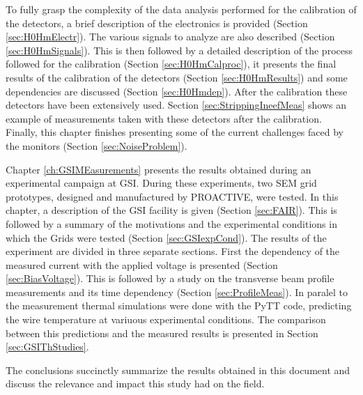 To fully grasp the complexity of the data analysis performed for the calibration of the detectors, a brief description of the electronics is provided (Section \ref{sec:H0HmElectr}). The various signals to analyze are also described (Section \ref{sec:H0HmSignals}). This is then followed by a detailed description of the process followed for the calibration (Section \ref{sec:H0HmCalproc}), it presents the final results of the calibration of the detectors (Section \ref{sec:H0HmResults}) and some dependencies are discussed (Section \ref{sec:H0Hmdep}). After the calibration these detectors have been extensively used. Section \ref{sec:StrippingIneefMeas} shows an example of measurements taken with these detectors after the calibration. Finally, this chapter finishes presenting some of the current challenges faced by the \hzhm monitors (Section \ref{sec:NoiseProblem}). 

Chapter \ref{ch:GSIMEasurements} presents the results obtained during an experimental campaign at GSI. During these experiments, two SEM grid prototypes, designed and manufactured by PROACTIVE, were tested. In this chapter, a description of the GSI facility is given (Section \ref{sec:FAIR}). This is followed by a summary of the motivations and the experimental conditions in which the Grids were tested  (Section \ref{sec:GSIexpCond}). The results of the experiment are divided in three separate sections. First the dependency of the measured current with the applied voltage is presented (Section \ref{sec:BiasVoltage}). This is followed by a study on the transverse beam profile measurements and its time dependency (Section \ref{sec:ProfileMeas}). In paralel to the measurement thermal simulations were done with the PyTT code, predicting the wire temperature at variuous experimental conditions. The comparison between this predictions and the measured results is presented in Section \ref{sec:GSIThStudies}.

The conclusions succinctly summarize the results obtained in this document and discuss the relevance and impact this study had on the field.